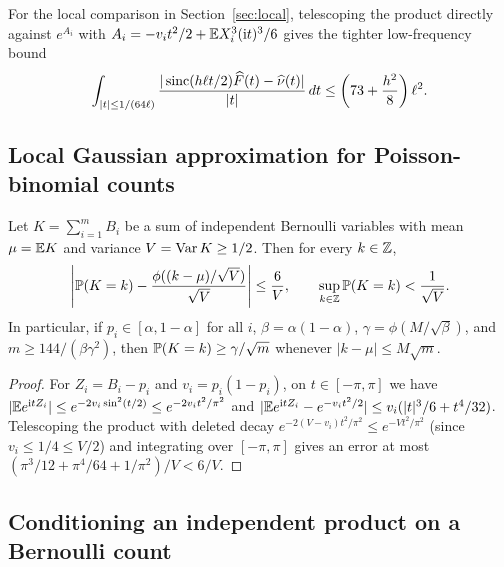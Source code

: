 For the local comparison in Section~\ref{sec:local}, telescoping the product
directly against $e^{A_i}$ with $A_i=-v_it^2/2+\mathbb E X_i^3(\mathrm i t)^3/6$ gives
the tighter low-frequency bound
\begin{equation}\label{eq:small-low-frequency}
 \int_{|t|\le1/(64\ell)}
 \frac{|\operatorname{sinc}(h\ell t/2)\widehat F(t)-\widehat\nu(t)|}{|t|}\,dt
                         \le\left(73+\frac{h^2}{8}\right)\ell^2.
\end{equation}

\subsection{Local Gaussian approximation for Poisson-binomial counts}

\begin{lemma}\label{lem:count-estimate}
Let $K=\sum_{i=1}^m B_i$ be a sum of independent Bernoulli variables with
mean $\mu=\mathbb E K$ and variance $V=\operatorname{Var} K\ge1/2$. Then for every $k\in\mathbb Z$,
\begin{equation}\label{eq:count-estimate}
 \left|\mathbb P(K=k)-\frac{\phi((k-\mu)/\sqrt V)}{\sqrt V}\right|
                   \le\frac6V,\qquad
 \sup_{k\in\mathbb Z}\mathbb P(K=k)<\frac1{\sqrt V}.
\end{equation}
In particular, if $p_i\in[\alpha,1-\alpha]$ for all $i$, $\beta=\alpha(1-\alpha)$,
$\gamma=\phi(M/\sqrt\beta)$, and $m\ge144/(\beta\gamma^2)$, then
$\mathbb P(K=k)\ge\gamma/\sqrt m$ whenever $|k-\mu|\le M\sqrt m$.
\end{lemma}
\begin{proof}
For $Z_i=B_i-p_i$ and $v_i=p_i(1-p_i)$, on $t\in[-\pi,\pi]$ we have
$|\mathbb E e^{\mathrm i tZ_i}|\le e^{-2v_i\sin^2(t/2)}\le e^{-2v_it^2/\pi^2}$ and
$|\mathbb E e^{\mathrm i tZ_i}-e^{-v_it^2/2}|\le v_i(|t|^3/6+t^4/32)$. Telescoping the
product with deleted decay $e^{-2(V-v_i)t^2/\pi^2}\le e^{-Vt^2/\pi^2}$
(since $v_i\le1/4\le V/2$) and
integrating over $[-\pi,\pi]$ gives an error at most
$(\pi^3/12+\pi^4/64+1/\pi^2)/V<6/V$.
\end{proof}

\subsection{Conditioning an independent product on a Bernoulli count}

